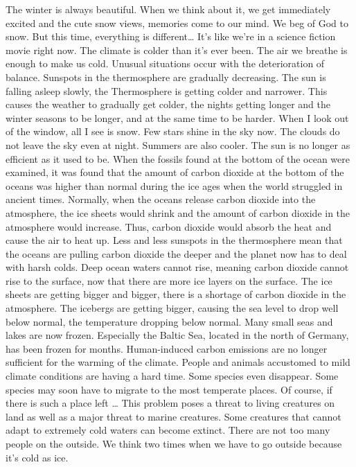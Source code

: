 \documentclass[]{book}
\begin{document}
The winter is always beautiful. When we think about it, we get immediately excited and the cute snow views, memories come to our mind. We beg of God to snow. But this time, everything is different\ldots{} It's like we're in a science fiction movie right now. The climate is colder than it's ever been. The air we breathe is enough to make us cold. Unusual situations occur with the deterioration of balance. Sunspots in the thermosphere are gradually decreasing. The sun is falling asleep slowly, the Thermosphere is getting colder and narrower. This causes the weather to gradually get colder, the nights getting longer and the winter seasons to be longer, and at the same time to be harder. When I look out of the window, all I see is snow. Few stars shine in the sky now. The clouds do not leave the sky even at night. Summers are also cooler. The sun is no longer as efficient as it used to be. When the fossils found at the bottom of the ocean were examined, it was found that the amount of carbon dioxide at the bottom of the oceans was higher than normal during the ice ages when the world struggled in ancient times. Normally, when the oceans release carbon dioxide into the atmosphere, the ice sheets would shrink and the amount of carbon dioxide in the atmosphere would increase. Thus, carbon dioxide would absorb the heat and cause the air to heat up. Less and less sunspots in the thermosphere mean that the oceans are pulling carbon dioxide the deeper and the planet now has to deal with harsh colds. Deep ocean waters cannot rise, meaning carbon dioxide cannot rise to the surface, now that there are more ice layers on the surface. The ice sheets are getting bigger and bigger, there is a shortage of carbon dioxide in the atmosphere. The icebergs are getting bigger, causing the sea level to drop well below normal, the temperature dropping below normal. Many small seas and lakes are now frozen. Especially the Baltic Sea, located in the north of Germany, has been frozen for months. Human-induced carbon emissions are no longer sufficient for the warming of the climate. People and animals accustomed to mild climate conditions are having a hard time. Some species even disappear. Some species may soon have to migrate to the most temperate places. Of course, if there is such a place left \ldots{} This problem poses a threat to living creatures on land as well as a major threat to marine creatures. Some creatures that cannot adapt to extremely cold waters can become extinct. There are not too many people on the outside. We think two times when we have to go outside because it's cold as ice.
\end{document}

